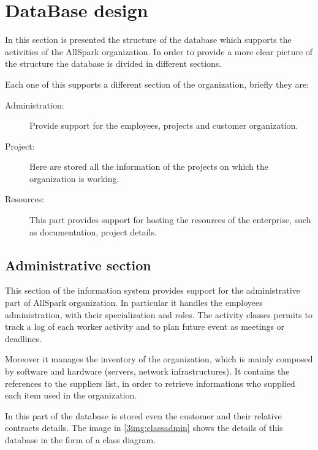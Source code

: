\section{DataBase design}
In this section is presented the structure of the database which supports
the activities of the AllSpark organization.
In order to provide a more clear picture of the structure the database is
divided in different sections. 

Each one of this supports a different section of the organization, briefly
they are:
\begin{description}
\item[Administration: ] Provide support for the employees, projects and
customer organization.
\item[Project: ] Here are stored all the information of the projects on
which the organization is working.
\item[Resources: ] This part provides support for hosting the resources of
the enterprise, such as documentation, project details.
\end{description}

\subsection{Administrative section}
This section of the information system provides support for the
administrative part of AllSpark organization.
In particular it handles the employees administration, with their
specialization and roles. The activity classes permits to track a log of
each worker activity and to plan future event as meetings or deadlines.

Moreover it manages the inventory of the organization, which is mainly
composed by software and hardware (servers, network infrastructures). It
contains the references to the suppliers list, in order to retrieve
informations who supplied each item used in the organization.

In this part of the database is stored even the customer and their
relative contracts details. The image in \ref{3img:classadmin} shows the
details of this database in the form of a class diagram.

